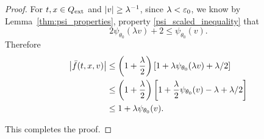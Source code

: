 \begin{proof}
For $t,x \in {Q_\textrm{ext}}$ and $|v| \geq \lambda^{-1}$, since $\lambda < \varepsilon_0$, we know by Lemma~\ref{thm:psi_properties}, property \eqref{psi_scaled_inequality} that
\[ 2 \psi_{\theta_0}(\lambda v) + 2 \leq \psi_{\theta_0}(v). \]
Therefore
\begin{align*} 
\left\lvert \bar{f}(t,x,v) \right\rvert &\leq \left( 1 + \frac{\lambda}{2} \right) \left[ 1 + \lambda \psi_{\theta_0}(\lambda v) + \lambda/2 \right] 
\\ &\leq \left( 1 + \frac{\lambda}{2} \right) \left[ 1 + \frac{\lambda}{2} \psi_{\theta_0}(v) - \lambda + \lambda/2 \right] 
\\ &\leq 1 + \lambda \psi_{\theta_0}(v).
\end{align*}

This completes the proof.  

\end{proof}

%
%
%
%
%
%
%
%

